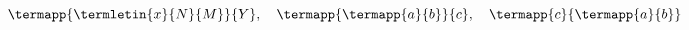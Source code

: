 \documentclass[a4paper]{jsarticle}
\begin{document}
  \indent
    \[
      \termapp{\termletin{x}{N}{M}}{Y},\quad
      \termapp{\termapp{a}{b}}{c},\quad
      \termapp{c}{\termapp{a}{b}}
    \]
  \par
\end{document}
